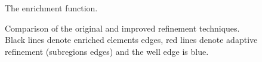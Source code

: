 \documentclass{elsarticle}
\newcommand{\figpath}{../graphics/}
\begin{document}
\begin{figure}[!htb]
  \begin{center}         
    \def\svgwidth{0.5\textwidth}
    
  \end{center}
  \caption{The enrichment function.}
  \label{fig:enrich_func}
\end{figure}


\begin{figure}[!htb]
  \centering    
  \hspace{0pt}
  \caption[Adaptive refinement comparison]
  {Comparison of the original and improved refinement techniques.
   Black lines denote enriched elements edges, red lines denote adaptive refinement (subregions edges) and the well
   edge is blue.
  }
  \label{fig:adapt_refinement}
\end{figure}
\end{document}
